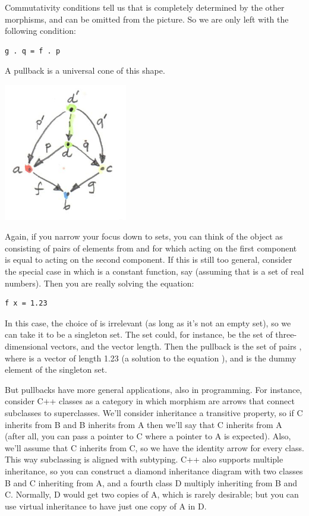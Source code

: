 Commutativity conditions tell us that  is completely
determined by the other morphisms, and can be omitted from the picture.
So we are only left with the following condition:

\begin{verbatim}
g . q = f . p
\end{verbatim}

A pullback is a universal cone of this shape.

\includegraphics[width=2.12500in]{images/pullbacklimit.jpg}

Again, if you narrow your focus down to sets, you can think of the
object  as consisting of pairs of elements from  and
 for which  acting on the first component is equal
to  acting on the second component. If this is still too
general, consider the special case in which  is a constant
function, say  (assuming that  is a set
of real numbers). Then you are really solving the equation:

\begin{verbatim}
f x = 1.23
\end{verbatim}

In this case, the choice of  is irrelevant (as long as it's
not an empty set), so we can take it to be a singleton set. The set
 could, for instance, be the set of three-dimensional vectors,
and  the vector length. Then the pullback is the set of pairs
, where  is a vector of length 1.23 (a
solution to the equation ), and
\code{()} is the dummy element of the singleton set.

But pullbacks have more general applications, also in programming. For
instance, consider C++ classes as a category in which morphism are
arrows that connect subclasses to superclasses. We'll consider
inheritance a transitive property, so if C inherits from B and B
inherits from A then we'll say that C inherits from A (after all, you
can pass a pointer to C where a pointer to A is expected). Also, we'll
assume that C inherits from C, so we have the identity arrow for every
class. This way subclassing is aligned with subtyping. C++ also supports
multiple inheritance, so you can construct a diamond inheritance diagram
with two classes B and C inheriting from A, and a fourth class D
multiply inheriting from B and C. Normally, D would get two copies of A,
which is rarely desirable; but you can use virtual inheritance to have
just one copy of A in D.

